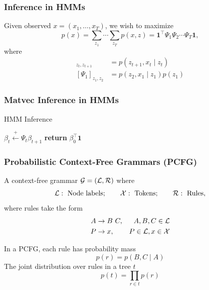\documentclass{beamer}
\begin{document}
\begin{frame}
\frametitle{Inference in HMMs}
Given observed $x = (x_1, \ldots, x_T)$,
\vspace{1em}
we wish to maximize
\begin{equation*}
p(x)
= \sum_{z_1}\cdots\sum_{z_T}p(x, z)
= \bm1^\top\Psi_1\Psi_2\cdots\Psi_T\bm1,
\end{equation*}
where
\begin{align*}
[\Psi_{t}]_{z_t,z_{t+1}} &= p(z_{t+1},x_t \mid z_t)\\
[\Psi_{1}]_{z_1,z_2} &= p(z_2,x_1 \mid z_1)p(z_1)
\end{align*}
\end{frame}

\begin{frame}
\frametitle{Matvec Inference in HMMs}

\begin{algorithm}[H]
\caption{HMM Inference}
\begin{algorithmic}
\STATE $\beta_t \stackrel{+}{\gets} \Psi_t \beta_{t+1}$
\ENDFOR
\STATE \textbf{return} $\beta_0^\top \mathbf{1}$
\end{algorithmic}
\end{algorithm}
\end{frame}

\begin{frame}
\frametitle{Probabilistic Context-Free Grammars (PCFG)}
A context-free grammar $\mathcal{G} = (\mathcal{L},\mathcal{R})$ where
$$
    \mathcal{L}: \text{ Node labels};\qquad
    \mathcal{X}: \text{ Tokens};\qquad
    \mathcal{R}: \text{ Rules},
$$
where rules take the form
\begin{align*}
A&\to B\ C, & A,B,C\in\mathcal{L} \\
P&\to x, & P \in\mathcal{L},x\in\mathcal{X}
\end{align*}

In a PCFG, each rule has probability mass
$$p(r) = p(B,C \mid A)$$
The joint distribution over rules in a tree $t$
$$p(t) = \prod_{r\in t} p(r)$$

\end{frame}
\end{document}
